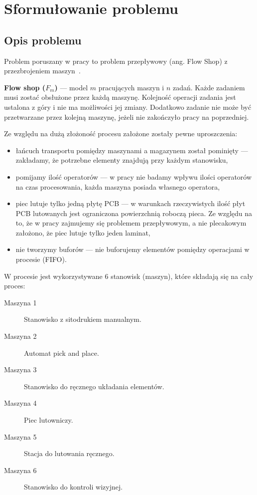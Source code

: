 \chapter{Sformułowanie problemu}

\section{Opis problemu}
Problem poruszany w pracy to problem przepływowy (ang. Flow Shop) z przezbrojeniem maszyn~\cite{188148}.

\breakparagraph{}
\textbf{Flow shop ($F_{m}$)} --- model $m$ pracujących maszyn i $n$ zadań. Każde zadaniem musi zostać obsłużone przez każdą maszynę. Kolejność operacji zadania jest ustalona z góry i nie ma możliwości jej zmiany. Dodatkowo zadanie nie może być przetwarzane przez kolejną maszynę, jeżeli nie zakończyło pracy na poprzedniej.

\breakparagraph{}
Ze względu na dużą złożoność procesu założone zostały pewne uproszczenia:
\begin{itemize}
	\item łańcuch transportu pomiędzy maszynami a magazynem został pominięty --- zakładamy, że potrzebne elementy znajdują przy każdym stanowisku,
	\item pomijamy ilość operatorów --- w pracy nie badamy wpływu ilości operatorów na czas procesowania, każda maszyna posiada własnego operatora,
	\item piec lutuje tylko jedną płytę PCB --- w warunkach rzeczywistych ilość płyt PCB lutowanych jest ograniczona powierzchnią roboczą pieca. Ze względu na to, że w pracy zajmujemy się problemem przepływowym, a nie plecakowym założono, że piec lutuje tylko jeden laminat,
	\item nie tworzymy buforów --- nie buforujemy elementów pomiędzy operacjami w procesie (FIFO).
\end{itemize}

W procesie jest wykorzystywane 6 stanowisk (maszyn), które składają się na cały proces:
\begin{description}
	\item[Maszyna 1] Stanowisko z sitodrukiem manualnym.
	\item[Maszyna 2] Automat pick and place.
	\item[Maszyna 3] Stanowisko do ręcznego układania elementów.
	\item[Maszyna 4] Piec lutowniczy.
	\item[Maszyna 5] Stacja do lutowania ręcznego.
	\item[Maszyna 6] Stanowisko do kontroli wizyjnej.
\end{description}

